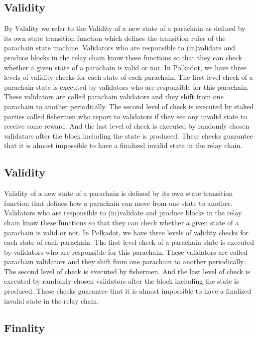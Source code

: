 \subsection{Validity}
By Validity we refer to the Validity of a new state of a parachain as defined by its own state transition function which defines the transition rules of the parachain state machine. Validators who are responsible to (in)validate and produce blocks in the relay chain  know these functions so that they can  check whether a given state of a parachain is valid or not.  In Polkadot, we have three levels of validity checks for each state of each parachain. The first-level check of a parachain state is executed by validators who are responsible for this parachain. These validators are called parachain validators and they shift from one parachain to another periodically. The second level of check is executed by staked parties called fishermen who report to validators if they see any invalid state to receive some reward. And the last level of check is executed by randomly chosen validators after the block including the state is produced. These checks guarantee that it is almost impossible to have a finalized invalid state in the relay chain.

 \subsection{Validity}
Validity of a new state of a parachain is defined by its own state transition function that defines how a parachain can move from one state to another. Validators who are responsible to (in)validate and produce blocks in the relay chain  know these functions so that they can  check whether a given state of a parachain is valid or not.  In Polkadot, we have three levels of validity checks for each state of each parachain. The first-level check of a parachain state is executed by validators who are responsible for this parachain. These validators are called parachain validators and they shift from one parachain to another periodically. The second level of check is executed by fishermen. And the last level of check is executed by randomly chosen validators after the block including the state is produced. These checks guarantee that it is almost impossible to have a finalized invalid state in the relay chain.

 \subsection{Finality}

